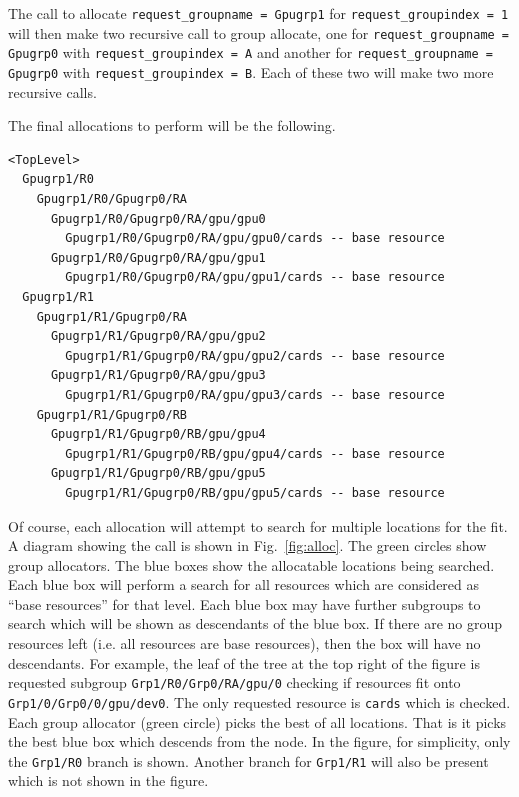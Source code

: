 \documentclass[12pt,onecolumn]{IEEEtran}
\newcommand{\bus}{\_\allowbreak}
\begin{document}
The call to allocate \texttt{request{\bus}groupname = Gpugrp1} for
\texttt{request{\bus}groupindex = 1} will then
make two recursive call to group allocate, one for
\texttt{request{\bus}groupname = Gpugrp0} with
\texttt{request{\bus}groupindex = A} and another for
\texttt{request{\bus}groupname = Gpugrp0} with
\texttt{request{\bus}groupindex = B}.
Each of these two will make two more recursive calls.

The final allocations to perform will be the following.
\ttfamily
\begin{verbatim}
<TopLevel>
  Gpugrp1/R0
    Gpugrp1/R0/Gpugrp0/RA
      Gpugrp1/R0/Gpugrp0/RA/gpu/gpu0
        Gpugrp1/R0/Gpugrp0/RA/gpu/gpu0/cards -- base resource
      Gpugrp1/R0/Gpugrp0/RA/gpu/gpu1
        Gpugrp1/R0/Gpugrp0/RA/gpu/gpu1/cards -- base resource
  Gpugrp1/R1
    Gpugrp1/R1/Gpugrp0/RA
      Gpugrp1/R1/Gpugrp0/RA/gpu/gpu2
        Gpugrp1/R1/Gpugrp0/RA/gpu/gpu2/cards -- base resource
      Gpugrp1/R1/Gpugrp0/RA/gpu/gpu3
        Gpugrp1/R1/Gpugrp0/RA/gpu/gpu3/cards -- base resource
    Gpugrp1/R1/Gpugrp0/RB
      Gpugrp1/R1/Gpugrp0/RB/gpu/gpu4
        Gpugrp1/R1/Gpugrp0/RB/gpu/gpu4/cards -- base resource
      Gpugrp1/R1/Gpugrp0/RB/gpu/gpu5
        Gpugrp1/R1/Gpugrp0/RB/gpu/gpu5/cards -- base resource
\end{verbatim}
\normalfont

Of course, each allocation will attempt to search for multiple locations
for the fit.
A diagram showing the call is shown in Fig.~\ref{fig:alloc}.
The green circles show group allocators. 
The blue boxes show the allocatable locations being searched.
Each blue box will perform a search for all resources which 
are considered as ``base resources'' for that level.
Each blue box may have further subgroups to search which will
be shown as descendants of the blue box.
If there are no group resources left (i.e. all resources are base
resources), then the box will have no descendants.
For example, the leaf of the tree at the top right of the figure is
requested subgroup \texttt{Grp1/R0/Grp0/RA/gpu/0} checking
if resources fit onto \texttt{Grp1/0/Grp0/0/gpu/dev0}.
The only requested resource is \texttt{cards} which is checked.
Each group allocator (green circle) picks the best of all locations.
That is it picks the best blue box which descends from the node.
In the figure, for simplicity, only the \texttt{Grp1/R0} branch is shown.
Another branch for \texttt{Grp1/R1} will also be present which is not
shown in the figure.
\end{document}
